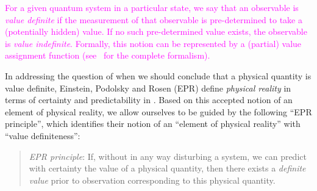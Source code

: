 \documentclass[%
 superscriptaddress,
 preprint,
 showpacs,
 showkeys,
 preprintnumbers,
  amsmath,amssymb,
  aps,
 pra,
  longbibliography,
  floatfix,
 ]{revtex4-1}
\theoremstyle{definition}
\begin{document}



\textcolor{magenta}{
For a given quantum system in a particular state, we say that an observable is \emph{value definite} if the measurement of that observable is pre-determined to take a (potentially hidden) value.
If no such pre-determined value exists, the observable is \emph{value indefinite}.
Formally, this notion can be represented by a (partial) value assignment function (see~\cite{2012-incomput-proofsCJ} for the complete formalism).
}


In addressing the question of
when we should conclude that a physical quantity is value definite,
Einstein, Podolsky and Rosen (EPR)  define {\em physical reality} in terms of certainty and predictability in \cite[p.~777]{epr}.
Based on this accepted notion of an element of physical reality,
we allow ourselves to be guided by
the following  ``EPR principle'',
which identifies their notion of an ``element of physical reality'' with ``value definiteness'':
\begin{quote}
	{\em EPR principle}: If, without in any way disturbing a system, we can predict with certainty the value of a physical quantity, then there exists a \emph{definite value} prior to observation corresponding to this physical quantity.
\end{quote}
\end{document}
